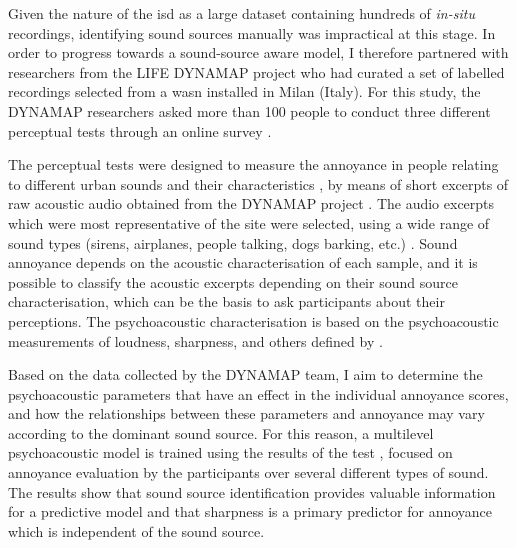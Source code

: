 Given the nature of the \gls{isd} as a large dataset containing hundreds of \emph{in-situ} recordings, identifying sound sources manually was impractical at this stage. In order to progress towards a sound-source aware model, I therefore partnered with researchers from the LIFE DYNAMAP project who had curated a set of labelled recordings selected from a \gls{wasn} installed in Milan (Italy). For this study, the DYNAMAP researchers asked more than 100 people to conduct three different perceptual tests through an online survey \citep{AlsinaPages2021Perceptual}. 

The perceptual tests were designed to measure the annoyance in people relating to different urban sounds and their characteristics \citep{LabairuTrenchs2018Noise,AlsinaPages2021Perceptual}, by means of short excerpts of raw acoustic audio obtained from the DYNAMAP project \citep{Sevillano2016DYNAMAP}. The audio excerpts which were most representative of the site were selected, using a wide range of sound types (sirens, airplanes, people talking, dogs barking, etc.) \citep{Alias2020Aggregate,Alias2020WASN}. Sound annoyance depends on the acoustic characterisation of each sample, and it is possible to classify the acoustic excerpts depending on their sound source characterisation, which can be the basis to ask participants about their perceptions. The psychoacoustic characterisation is based on the psychoacoustic measurements of loudness, sharpness, and others defined by \citet{PsychoacousticsfactsmodelsZwicker}.

Based on the data collected by the DYNAMAP team, I aim to determine the psychoacoustic parameters that have an effect in the individual annoyance scores, and how the relationships between these parameters and annoyance may vary according to the dominant sound source. For this reason, a multilevel psychoacoustic model is trained using the results of the  test \citep{IRB2015Method}, focused on annoyance evaluation by the participants over several different types of sound. The results show that sound source identification provides valuable information for a predictive model and that sharpness is a primary predictor for annoyance which is independent of the sound source.


